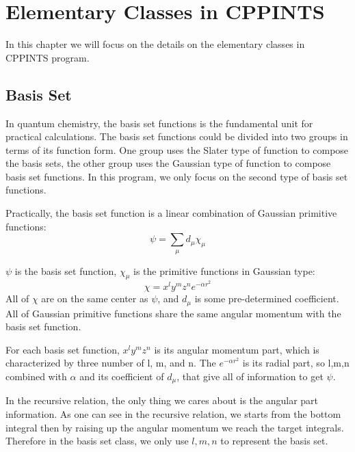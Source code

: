%
% 
%
\chapter{Elementary Classes in CPPINTS}
%
%
%
In this chapter we will focus on the details on the elementary classes
in CPPINTS program.

\section{Basis Set}
%
%
\label{bs}

In quantum chemistry, the basis set functions is the fundamental 
unit for practical calculations\cite{Davidson_Feller_CR_86_681_1986}. 
The basis set functions could be 
divided into two groups in terms of its function form. One group
uses the Slater type of function to compose the basis sets, 
the other group uses the Gaussian type of function to compose 
basis set functions. In this program, we only focus on the 
second type of basis set functions.

Practically, the basis set function is a linear combination of 
Gaussian primitive functions:
\begin{equation}
	\psi = \sum_{\mu}d_{\mu}\chi_{\mu}
\end{equation}

$\psi$ is the basis set function, $\chi_{\mu}$ is the primitive 
functions in Gaussian type:
\begin{equation}\label{gaussian_function}
	\chi = x^{l}y^{m}z^{n}e^{-\alpha r^{2}}
\end{equation}
All of $\chi$ are on the same center as $\psi$, and $d_{\mu}$ is 
some pre-determined coefficient. All of Gaussian primitive 
functions share the same angular momentum with the basis set
function.

For each basis set function, $x^{l}y^{m}z^{n}$ is its angular momentum part,
which is characterized by three number of l, m, and n. The $e^{-\alpha r^{2}}$
is its radial part, so l,m,n combined with $\alpha$ and its coefficient of
$d_{\mu}$, that give all of information to get $\psi$.

In the recursive relation, the only thing we cares about 
is the angular part information. As one can see in the recursive
relation, we starts from the bottom integral then by raising up the 
angular momentum we reach the target integrals. Therefore in the basis set class, 
we only use $l,m,n$ to represent the basis set.

